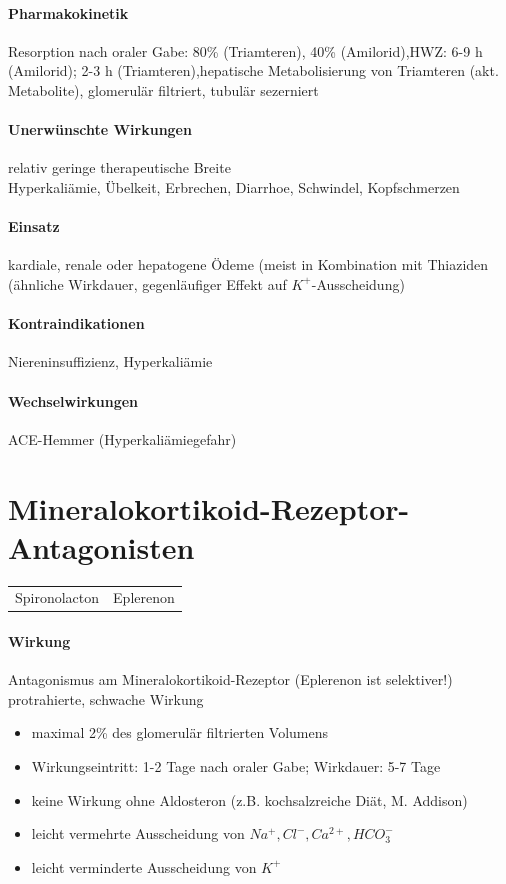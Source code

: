 \documentclass[10pt,a4paper]{report}
\begin{document}
\paragraph{Pharmakokinetik}Resorption nach oraler Gabe: 80\% (Triamteren), 40\% (Amilorid),HWZ: 6-9 h (Amilorid); 2-3 h (Triamteren),hepatische Metabolisierung von Triamteren (akt. Metabolite), glomerulär filtriert, tubulär sezerniert
\paragraph{Unerwünschte Wirkungen}relativ geringe therapeutische Breite\\
Hyperkaliämie, Übelkeit, Erbrechen, Diarrhoe, Schwindel, Kopfschmerzen
\paragraph{Einsatz}
kardiale, renale oder hepatogene Ödeme (meist in Kombination mit Thiaziden (ähnliche Wirkdauer, gegenläufiger Effekt auf $K^+$-Ausscheidung)
\paragraph{Kontraindikationen}Niereninsuffizienz, Hyperkaliämie
\paragraph{Wechselwirkungen}ACE-Hemmer (Hyperkaliämiegefahr)
\section{Mineralokortikoid-Rezeptor-Antagonisten}
\begin{tabularx}{\textwidth}{XX}
Spironolacton&Eplerenon\\
\end{tabularx}
\paragraph{Wirkung}
Antagonismus am Mineralokortikoid-Rezeptor (Eplerenon ist selektiver!) protrahierte, schwache Wirkung
\begin{itemize}
	\item maximal 2\% des glomerulär filtrierten Volumens
	\item Wirkungseintritt: 1-2 Tage nach oraler Gabe; Wirkdauer: 5-7 Tage
	\item keine Wirkung ohne Aldosteron (z.B. kochsalzreiche Diät, M. Addison)
	\item leicht vermehrte Ausscheidung von $Na^+, Cl^-, Ca^{2+}, HCO_3^-$ 
	\item leicht verminderte Ausscheidung von $K^+$
\end{itemize}
\end{document}
